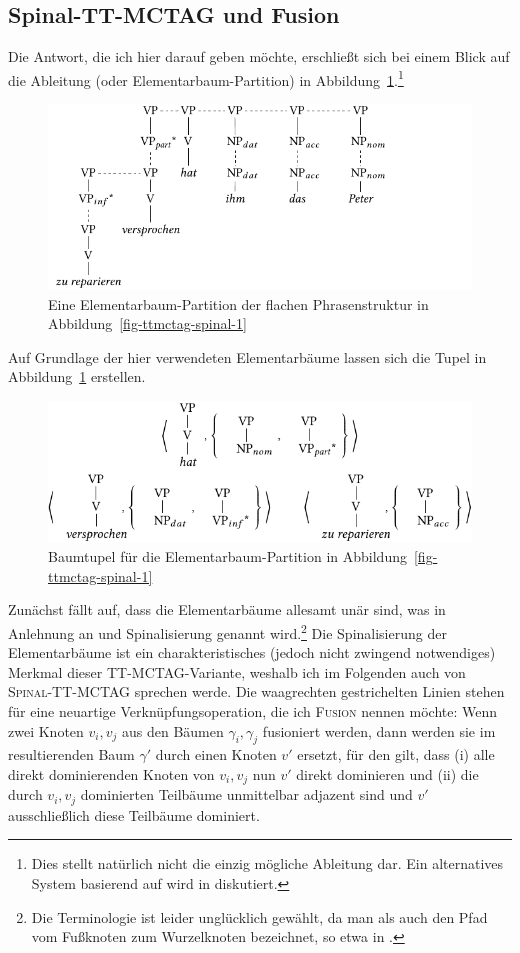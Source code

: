 \subsection{Spinal-TT-MCTAG und Fusion} 

Die Antwort, die ich hier darauf geben möchte, erschlie\ss t sich bei einem Blick auf die Ableitung (oder Elementarbaum-Partition) in Abbildung~\ref{fig-ttmctag-spinal-3}.\footnote{Dies stellt natürlich nicht die einzig mögliche Ableitung dar. Ein alternatives System basierend auf  wird in \cite{Lichte:10} diskutiert.} 
\begin{figure}[t]
\centering
\includegraphics{graphics/abb746.pdf}
\caption{\label{fig-ttmctag-spinal-3}Eine Elementarbaum-Partition der flachen Phrasenstruktur in Abbildung~\ref{fig-ttmctag-spinal-1}}
\end{figure}
Auf Grundlage der hier verwendeten Elementarbäume lassen sich die Tupel in Abbildung~\ref{fig-ttmctag-spinal-3} erstellen.  
\begin{figure}[t]
\centering
\includegraphics{graphics/abb747.pdf}
\caption{\label{fig-ttmctag-spinal-4}Baumtupel für die Elementarbaum-Partition in Abbildung~\ref{fig-ttmctag-spinal-1}}
\end{figure}
Zunächst fällt auf, dass die Elementarbäume allesamt unär sind, was in Anlehnung an \cite{Shen:06} und \cite{Shen:etal:08} Spinalisierung genannt wird.\footnote{Die Terminologie ist leider unglücklich gewählt, da man als  auch den Pfad vom Fu\ss knoten zum Wurzelknoten bezeichnet, so etwa in \cite{Schabes:Waters:95}.} Die Spinalisierung der Elementarbäume ist ein charakteristisches (jedoch nicht zwingend notwendiges) Merkmal dieser TT-MCTAG-Variante, weshalb ich im Folgenden auch von \textsc{Spinal-TT-MCTAG} sprechen werde. Die waagrechten gestrichelten Linien stehen für eine neuartige Verknüpfungsoperation, die ich \textsc{Fusion} nennen möchte: Wenn zwei Knoten $v_i,v_j$ aus den Bäumen $\gamma_i,\gamma_j$ fusioniert werden, dann werden sie im resultierenden Baum $\gamma'$ durch einen Knoten $v'$ ersetzt, für den gilt, dass (i) alle direkt dominierenden Knoten von $v_i, v_j$ nun $v'$ direkt dominieren und (ii) die durch $v_i,v_j$ dominierten Teilbäume unmittelbar adjazent sind und $v'$ ausschlie\ss lich diese Teilbäume dominiert.   
